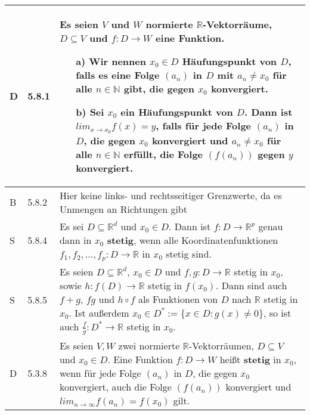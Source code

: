     \begin{longtable}{p{0.75cm} p{1cm} p{16cm}}
        \toprule

        D   & 5.8.1 &   Es seien $V$ und $W$ normierte $\mathbb{R}$-Vektorräume, $D \subseteq V$ und $f: D \rightarrow W$ eine Funktion.
                \begin{itemize}[topsep=-0.5cm]
                    \item[a)] Wir nennen $x_0 \in D$ \textbf{Häufungspunkt} von $D$, falls es eine Folge $(a_n)$ in $D$ mit 
                                $a_n \neq x_0$ für alle $n \in \mathbb{N}$ gibt, die gegen $x_0$ konvergiert.
                    \item[b)] Sei $x_0$ ein Häufungspunkt von $D$. Dann ist $lim_{x \rightarrow x_0} f(x) = y$, falls für jede 
                                Folge $(a_n)$ in $D$, die gegen $x_0$ konvergiert und $a_n \neq x_0$ für alle $n \in \mathbb{N}$
                                erfüllt, die Folge $(f(a_n))$ gegen $y$ konvergiert.
                \end{itemize} \vspace{-0cm} \\
        \midrule
        B   & 5.8.2 &   Hier keine links- und rechtsseitiger Grenzwerte, da es Unmengen an Richtungen gibt \\
        \midrule
        S   & 5.8.4 &   Es sei $D \subseteq \mathbb{R}^d$ und $x_0 \in D$. Dann ist $f: D \rightarrow \mathbb{R}^p$ genau dann in $x_0$
                        \textbf{stetig}, wenn alle Koordinatenfunktionen $f_1, f_2, \dots, f_p : D \rightarrow \mathbb{R}$ in $x_0$ stetig sind. \\
        \midrule
        S   & 5.8.5 &   Es seien $D \subseteq \mathbb{R}^d$, $x_0 \in D$ und $f,g : D \rightarrow \mathbb{R}$ stetig in $x_0$, sowie
                        $h : f(D) \rightarrow \mathbb{R}$ stetig in $f(x_0)$. Dann sind auch $f+g$, $fg$ und $h \circ f$ als Funktionen
                        von $D$ nach $\mathbb{R}$ stetig in $x_0$. \hfill \break
                        Ist au\ss erdem $x_0 \in D^* := \{x \in D: g(x) \neq 0\}$, so ist auch $\frac{f}{g}:D^* \rightarrow \mathbb{R}$ stetig in $x_0$. \\
        \midrule
        D   & 5.3.8 &   Es seien $V,W$ zwei normierte $\mathbb{R}$-Vektorräumen, $D \subseteq V$ und $x_0 \in D$. Eine Funktion $f: D\rightarrow W$
                heißt \textbf{stetig} in $x_0$, wenn für jede Folge $(a_n)$ in $D$, die gegen $x_0$ konvergiert, auch die Folge
                $(f(a_n))$ konvergiert und $lim_{n \rightarrow \infty} f(a_n) = f(x_0)$ gilt. \hfill \break

\end{longtable}
